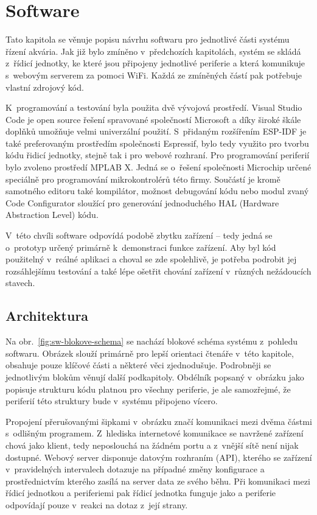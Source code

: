 \chapter{Software}
    Tato kapitola se věnuje popisu návrhu softwaru pro jednotlivé části systému řízení akvária. Jak již bylo zmíněno v~předchozích kapitolách, systém se skládá z~řídicí jednotky, ke které jsou připojeny jednotlivé periferie a která komunikuje s~webovým serverem za pomoci WiFi. Každá ze zmíněných částí pak potřebuje vlastní zdrojový kód. 
    
    K~programování a testování byla použita dvě vývojová prostředí. Visual Studio Code je open source řešení spravované společností Microsoft a díky široké škále doplňků umožňuje velmi univerzální použití. S~přidaným rozšířením ESP-IDF je také preferovaným prostředím společnosti Espressif, bylo tedy využito pro tvorbu kódu řidicí jednotky, stejně tak i pro webové rozhraní. Pro programování periferií bylo zvoleno prostředí MPLAB X. Jedná se o~řešení společnosti Microchip určené speciálně pro programování mikrokontrolérů této firmy. Součástí je kromě samotného editoru také kompilátor, možnost debugování kódu nebo modul zvaný Code Configurator sloužící pro generování jednoduchého HAL (Hardware Abstraction Level) kódu.

    V~této chvíli software odpovídá podobě zbytku zařízení -- tedy jedná se o~prototyp určený primárně k~demonstraci funkce zařízení. Aby byl kód použitelný v~reálné aplikaci a choval se zde spolehlivě, je potřeba podrobit jej rozsáhlejšímu testování a také lépe ošetřit chování zařízení v~různých nežádoucích stavech.   

\section{Architektura}
    Na obr.~\ref{fig:sw-blokove-schema} se nachází blokové schéma systému z~pohledu softwaru. Obrázek slouží primárně pro lepší orientaci čtenáře v~této kapitole, obsahuje pouze klíčové části a některé věci zjednodušuje. Podrobněji se jednotlivým blokům věnují další podkapitoly. Obdélník popsaný v~obrázku jako  popisuje strukturu kódu platnou pro všechny periferie, je ale samozřejmé, že periferií této struktury bude v~systému připojeno vícero.

    Propojení přerušovanými šipkami v~obrázku značí komunikaci mezi dvěma částmi s~odlišným programem. Z~hlediska internetové komunikace se navržené zařízení chová jako klient, tedy neposlouchá na žádném portu a z~vnější sítě není nijak dostupné. Webový server disponuje datovým rozhraním (API), kterého se zařízení v~pravidelných intervalech dotazuje na případné změny konfigurace a prostřednictvím kterého zasílá na server data ze svého běhu. Při komunikaci mezi řídicí jednotkou a periferiemi pak řídicí jednotka funguje jako  a periferie odpovídají pouze v~reakci na dotaz z~její strany.

